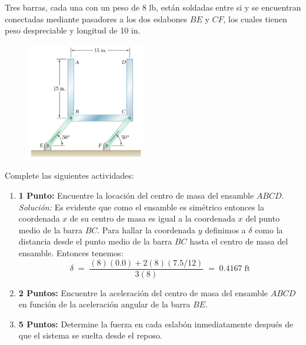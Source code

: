 \documentclass[ a4paper, twoside, 11pt]{article}
\begin{document}
\begin{problem}
Tres barras, cada una con un peso de 8 lb, est\'an soldadas entre si y se encuentran conectadas mediante pasadores a los dos eslabones $BE$ y $CF$, los cuales tienen peso despreciable y longitud de 10 in. 

\begin{figure}[htb]
\centering
\includegraphics[width=0.46\textwidth]{problema-02.jpg}
\end{figure}

Complete las siguientes actividades: 
\begin{enumerate}[label=\textbf{\alph*)}]
\item \textbf{1 Punto:} Encuentre la locaci\'on del centro de masa del ensamble $ABCD$. \\[1ex] \emph{Soluci\'on:} Es evidente que como el ensamble es sim\'etrico entonces la coordenada $x$ de su centro de masa es igual a la coordenada $x$ del punto medio de la barra $BC$. Para hallar la coordenada $y$ definimos a $\delta$ como la distancia desde el punto medio de la barra $BC$ hasta el centro de masa del ensamble. Entonces tenemos:
\[
\delta \; = \; 
\frac{(8)(0.0) + 2(8)(7.5/12)}{3(8)} \; = \; 0.4167 \; \text{ft}
\]
\item \textbf{2 Puntos:} Encuentre la aceleraci\'on del centro de masa del ensamble $ABCD$ en funci\'on de la aceleraci\'on angular de la barra $BE$. 
\item \textbf{5 Puntos:} Determine la fuerza en cada eslab\'on inmediatamente despu\'es de que el sistema se suelta desde el reposo. 
\end{enumerate}

\end{problem}
\fullskip
\end{document}
